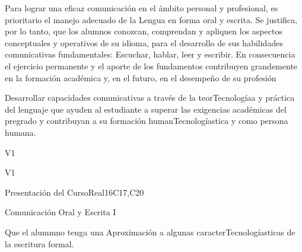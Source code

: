 \begin{syllabus}


\begin{justification}
Para lograr una eficaz comunicación en el ámbito personal y profesional, es prioritario el manejo adecuado de la Lengua en forma oral y escrita. Se justifica, por lo tanto, que los alumnos  conozcan, comprendan y apliquen los aspectos conceptuales y operativos de su idioma, para el desarrollo de sus habilidades comunicativas fundamentales: Escuchar, hablar, leer y escribir.
En consecuencia el ejercicio permanente y el aporte de los fundamentos contribuyen grandemente en la formación académica y, en el futuro, en el desempeño de su profesión
\end{justification}

\begin{goals}
\item Desarrollar capacidades comunicativas a través de la teorTecnologíaa y práctica del lenguaje que ayuden al estudiante a superar las exigencias académicas del pregrado y contribuyan a su formación humanTecnologíastica y como persona humana.
\end{goals}

\begin{outcomes}{V1}
   \item {}
   \item {}
   \item {}
\end{outcomes}

\begin{competences}{V1}
    \item {}
    \item {}
    \item {}
\end{competences}

\begin{unit}{Presentación del Curso}{}{Real}{16}{C17,C20}
  \begin{topics}
      \item Comunicación Oral y Escrita I
  \end{topics}

  \begin{learningoutcomes}
   \item Que el alummno tenga una Aproximación a algunas caracterTecnologíasticas de la escritura formal.
  \end{learningoutcomes}
\end{unit}


\end{syllabus}
